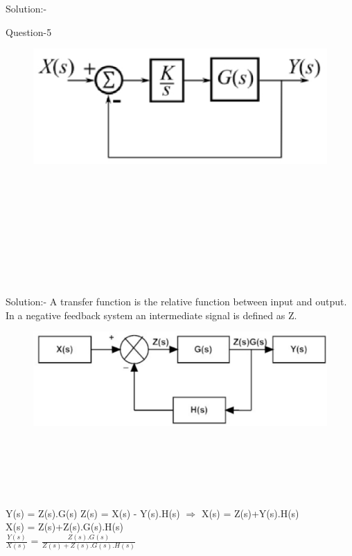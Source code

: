 \documentclass[journal,12pt,twocolumn]{IEEEtran}
\begin{document}
\begin{frame}{Solution:- }
\begin{frame}{Question-5 }
\begin{figure}[h]
     \includegraphics[width=\linewidth]{./figs/gate.eps}
    \end{figure}
\end{frame}
\\\\\\\\\\\\\\\\
\begin{frame}{Solution:- }
A transfer function is the relative function between input and output.
\newline In a negative feedback system an intermediate signal is defined as Z.
\begin{figure}
    \centering
    \includegraphics[width =\linewidth]{./figs/feedback.eps}
\end{figure}
\end{frame}
\begin{frame}
\\\\\\\\\\
Y(s) = Z(s).G(s)
\newline 
Z(s) = X(s) - Y(s).H(s) $\Rightarrow$ X(s) = Z(s)+Y(s).H(s)
\newline \\
X(s) = Z(s)+Z(s).G(s).H(s)
\newline \\
$\frac{Y(s)}{X(s)}$ = $\frac{Z(s).G(s)}{Z(s)+Z(s).G(s).H(s)}$


\end{frame}
\end{frame}
\end{document}
